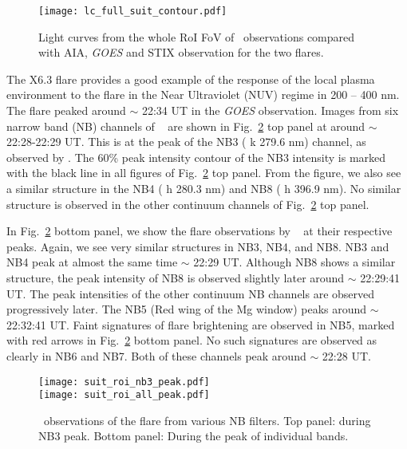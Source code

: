 \begin{figure}[ht!]
    \centering
    \texttt{[image: lc\_full\_suit\_contour.pdf]}
    \caption{Light curves from the whole RoI FoV of \suit~observations compared with AIA, {\it GOES} and STIX observation for the two flares.}
    \label{fig:flare_full}
\end{figure}

The X6.3 flare provides a good example of the response of the local plasma environment to the flare in the Near Ultraviolet (NUV) regime in 200 {--} 400 nm. The flare peaked around $\sim$ 22:34 UT in the {\it GOES} observation. Images from six narrow band (NB) channels of \suit~ are shown in Fig.~\ref{fig:flare_nb3_peak} top panel at around $\sim$ 22:28-22:29 UT. This is at the peak of the NB3 ( k 279.6 nm) channel, as observed by \suit. The 60\% peak intensity contour of the NB3 intensity is marked with the black line in all figures of Fig.~\ref{fig:flare_nb3_peak} top panel. From the figure, we also see a similar structure in the NB4 ( h 280.3 nm) and NB8 ( h 396.9 nm). No similar structure is observed in the other continuum channels of Fig.~\ref{fig:flare_nb3_peak} top panel.

In Fig.~\ref{fig:flare_nb3_peak} bottom panel, we show the flare observations by \suit~ at their respective peaks. Again, we see very similar structures in NB3, NB4, and NB8. NB3 and NB4 peak at almost the same time $\sim$ 22:29 UT. Although NB8 shows a similar structure, the peak intensity of NB8 is observed slightly later around $\sim$ 22:29:41 UT. The peak intensities of the other continuum NB channels are observed progressively later. The NB5 (Red wing of the Mg window) peaks around $\sim$ 22:32:41 UT. Faint signatures of flare brightening are observed in NB5, marked with red arrows in Fig.~\ref{fig:flare_nb3_peak} bottom panel. No such signatures are observed as clearly in NB6 and NB7. Both of these channels peak around $\sim$ 22:28 UT.

\begin{figure}[ht!]
    \centering
    \texttt{[image: suit\_roi\_nb3\_peak.pdf]} \\
    \texttt{[image: suit\_roi\_all\_peak.pdf]}
    \caption{\suit~observations of the flare from various NB filters. Top panel: during NB3 peak. Bottom panel: During the peak of individual bands.}
    \label{fig:flare_nb3_peak}
\end{figure}

